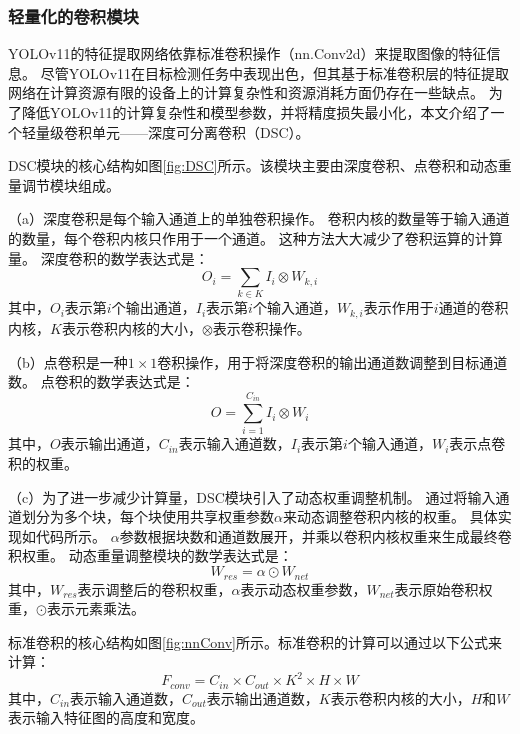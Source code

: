 \subsubsection{轻量化的卷积模块}

YOLOv11的特征提取网络依靠标准卷积操作（nn.Conv2d）来提取图像的特征信息。 
尽管YOLOv11在目标检测任务中表现出色，但其基于标准卷积层的特征提取网络在计算资源有限的设备上的计算复杂性和资源消耗方面仍存在一些缺点。 
为了降低YOLOv11的计算复杂性和模型参数，并将精度损失最小化，本文介绍了一个轻量级卷积单元——深度可分离卷积（DSC）。 

DSC模块的核心结构如图\ref{fig:DSC}所示。该模块主要由深度卷积、点卷积和动态重量调节模块组成。

（a）深度卷积是每个输入通道上的单独卷积操作。 卷积内核的数量等于输入通道的数量，每个卷积内核只作用于一个通道。 这种方法大大减少了卷积运算的计算量。 深度卷积的数学表达式是：
\begin{equation}
    O_i = \sum\limits_{k\in{K}}{I_i\otimes{W_{k,i}}}
\end{equation}
其中，$O_i$表示第$i$个输出通道，$I_i$表示第$i$个输入通道，$W_{k,i}$表示作用于$i$通道的卷积内核，$K$表示卷积内核的大小，$\otimes$表示卷积操作。

（b）点卷积是一种$1\times1$卷积操作，用于将深度卷积的输出通道数调整到目标通道数。 点卷积的数学表达式是：
\begin{equation}
    O = \sum\limits_{i=1}^{C_{in}}I_i\otimes{W_i}
\end{equation}
其中，$O$表示输出通道，$C_{in}$表示输入通道数，$I_i$表示第$i$个输入通道，$W_i$表示点卷积的权重。

（c）为了进一步减少计算量，DSC模块引入了动态权重调整机制。 通过将输入通道划分为多个块，每个块使用共享权重参数$\alpha$来动态调整卷积内核的权重。 具体实现如代码所示。 $\alpha$参数根据块数和通道数展开，并乘以卷积内核权重来生成最终卷积权重。 动态重量调整模块的数学表达式是：
\begin{equation}
    W_{res} = \alpha\odot{W_{net}}
\end{equation}
其中，$W_{res}$表示调整后的卷积权重，$\alpha$表示动态权重参数，$W_{net}$表示原始卷积权重，$\odot$表示元素乘法。

标准卷积的核心结构如图\ref{fig:nnConv}所示。标准卷积的计算可以通过以下公式来计算：
\begin{equation}
    F_{conv} = {C_{in}}\times{C_{out}}\times{K^2}\times{H}\times{W} \label{eq:conv}
\end{equation}
其中，$C_{in}$表示输入通道数，$C_{out}$表示输出通道数，$K$表示卷积内核的大小，$H$和$W$表示输入特征图的高度和宽度。 

